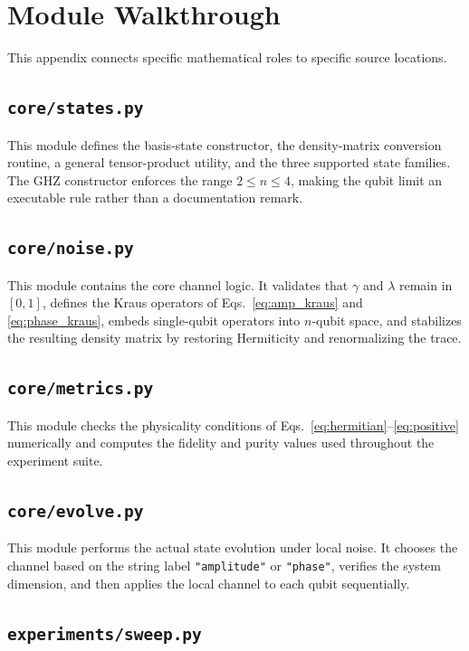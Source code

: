\chapter{Module Walkthrough}

This appendix connects specific mathematical roles to specific source locations.

\section{\texttt{core/states.py}}

This module defines the basis-state constructor, the density-matrix conversion routine, a general tensor-product utility, and the three supported state families. The GHZ constructor enforces the range $2 \le n \le 4$, making the qubit limit an executable rule rather than a documentation remark.

\section{\texttt{core/noise.py}}

This module contains the core channel logic. It validates that $\gamma$ and $\lambda$ remain in $[0,1]$, defines the Kraus operators of Eqs.~\eqref{eq:amp_kraus} and \eqref{eq:phase_kraus}, embeds single-qubit operators into $n$-qubit space, and stabilizes the resulting density matrix by restoring Hermiticity and renormalizing the trace.

\section{\texttt{core/metrics.py}}

This module checks the physicality conditions of Eqs.~\eqref{eq:hermitian}--\eqref{eq:positive} numerically and computes the fidelity and purity values used throughout the experiment suite.

\section{\texttt{core/evolve.py}}

This module performs the actual state evolution under local noise. It chooses the channel based on the string label \texttt{"amplitude"} or \texttt{"phase"}, verifies the system dimension, and then applies the local channel to each qubit sequentially.

\section{\texttt{experiments/sweep.py}}

